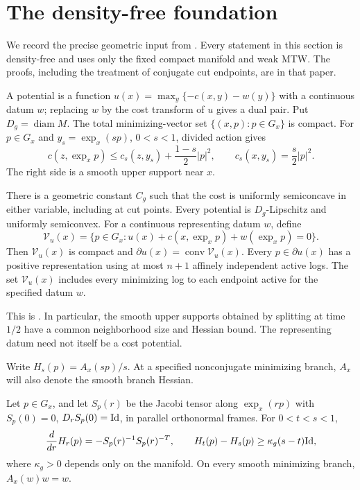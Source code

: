 \section{The density-free foundation}
\label{sec:geometry}

We record the precise geometric input from
\cite{Foundation2026}. Every statement in this section is
density-free and uses only the fixed compact manifold and weak
MTW. The proofs, including the treatment of conjugate cut
endpoints, are in that paper.

A potential is a function
$u(x)=\max_y\{-c(x,y)-w(y)\}$ with a continuous datum $w$;
replacing $w$ by the cost transform of $u$ gives a dual pair.
Put $D_g=\operatorname{diam}M$.
The total minimizing-vector set $\{(x,p):p\in G_x\}$ is compact.
For $p\in G_x$ and $y_s=\exp_x(sp)$, $0<s<1$, divided
action gives
\begin{equation}\label{geo:split-support}
 c(z,\exp_xp)\leq c_s(z,y_s)+\frac{1-s}{2}|p|^2,
 \qquad c_s(x,y_s)=\frac{s}{2}|p|^2.
\end{equation}
The right side is a smooth upper support near $x$.

\begin{lemma}\label{geo:prelim}
There is a geometric constant $C_g$ such that the cost is
uniformly semiconcave in either variable, including at cut
points. Every potential is $D_g$-Lipschitz and uniformly
semiconvex. For a continuous representing datum $w$, define
\[
 \mathcal V_u(x)=\{p\in G_x:
              u(x)+c(x,\exp_xp)+w(\exp_xp)=0\}.
\]
Then $\mathcal V_u(x)$ is compact and
$\partial u(x)=\operatorname{conv}\mathcal V_u(x)$.
Every $p\in\partial u(x)$ has a positive representation using at most
$n+1$ affinely independent active logs.
The set $\mathcal V_u(x)$ includes every minimizing log to
each endpoint active for the specified datum $w$.
\end{lemma}

This is \cite[Lemma~4.1]{Foundation2026}. In particular, the smooth upper
supports obtained by splitting at time $1/2$ have a common
neighborhood size and Hessian bound. The representing datum
need not itself be a cost potential.

Write $H_s(p)=A_x(sp)/s$. At a specified nonconjugate
minimizing branch, $A_x$ will also denote the smooth branch
Hessian.

\begin{lemma}\label{geo:radial-index}
Let $p\in G_x$, and let $S_p(r)$ be the Jacobi tensor along
$\exp_x(rp)$ with $S_p(0)=0$, $D_rS_p(0)=\mathrm{Id}$, in parallel
orthonormal frames. For $0<t<s<1$,
\[
 \frac{d}{dr}H_r(p)=-S_p(r)^{-1}S_p(r)^{-T},
 \qquad H_t(p)-H_s(p)\geq\kappa_g(s-t)\mathrm{Id},
\]
where $\kappa_g>0$ depends only on the manifold. On every
smooth minimizing branch, $A_x(w)w=w$.
\end{lemma}

